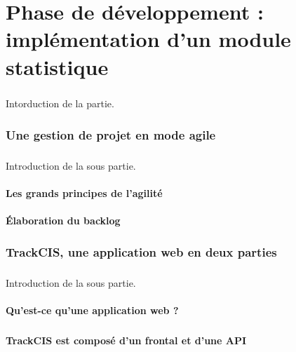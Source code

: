 \chapter{Phase de développement : implémentation d'un module statistique}
	\paragraph{}
	Intorduction de la partie.
	
	\subsection{Une gestion de projet en mode agile}
		\paragraph{}
		Introduction de la sous partie.
		
		\subsubsection{Les grands principes de l'agilité}
		\subsubsection{Élaboration du backlog}
	
	\subsection{TrackCIS, une application web en deux parties}
		\paragraph{}
		Introduction de la sous partie.
		
		\subsubsection{Qu'est-ce qu'une application web ?}
			\paragraph{}%
			
			\paragraph{}%
			
		\subsubsection{TrackCIS est composé d'un frontal et d'une API}
